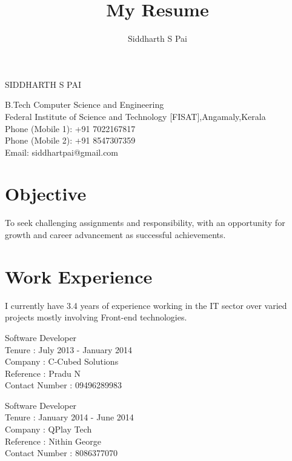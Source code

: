 \documentclass[a4paper]{article}
\title{My Resume}
\author{Siddharth S Pai}
\begin{document}
\pagestyle{empty}
\begin{center}

\Large
\textsc{SIDDHARTH S PAI}
\end{center}
\vspace{1.2\baselineskip}
\begin{flushleft}
B.Tech Computer Science and Engineering\\Federal Institute of Science and Technology [FISAT],Angamaly,Kerala\\
Phone (Mobile 1): +91 7022167817\\
Phone (Mobile 2): +91 8547307359\\
Email: siddhartpai@gmail.com \\
\end{flushleft}

\section{Objective}
\begin{flushleft}
To seek challenging assignments and responsibility, with an opportunity for growth and career advancement as successful achievements.
\end{flushleft}

\section{Work Experience}
\begin{flushleft}
I currently have 3.4 years of experience working in the IT sector over varied projects mostly involving Front-end technologies.
\end{flushleft}
\begin{CV}
\item Software Developer \\
Tenure : July 2013 - January 2014\\
Company : C-Cubed Solutions \\
Reference : Pradu N \\
Contact Number : 09496289983 \\ 
\end{CV}

\begin{CV}
\item Software Developer \\
Tenure : January 2014 - June 2014\\
Company : QPlay Tech \\
Reference : Nithin George \\
Contact Number : 8086377070 \\ 
\end{CV}
\end{document}
